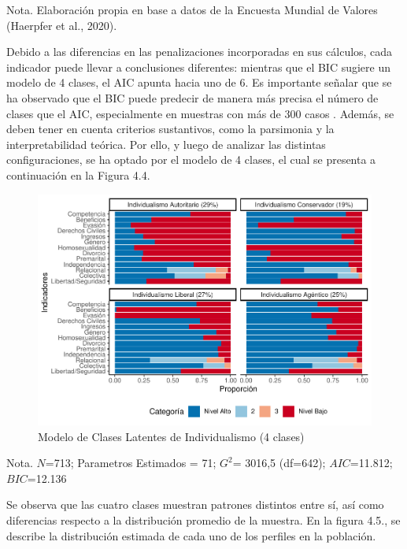 \documentclass[12pt,twoside]{templates/facsothesis}
\begin{document}
Nota. Elaboración propia en base a datos de la Encuesta Mundial de Valores (Haerpfer et al., 2020).

Debido a las diferencias en las penalizaciones incorporadas en sus cálculos, cada indicador puede llevar a conclusiones diferentes: mientras que el BIC sugiere un modelo de 4 clases, el AIC apunta hacia uno de 6. Es importante señalar que se ha observado que el BIC puede predecir de manera más precisa el número de clases que el AIC, especialmente en muestras con más de 300 casos \citep{nylund2007}. Además, se deben tener en cuenta criterios sustantivos, como la parsimonia y la interpretabilidad teórica. Por ello, y luego de analizar las distintas configuraciones, se ha optado por el modelo de 4 clases, el cual se presenta a continuación en la Figura 4.4.

\begin{figure}[!ht]

{\centering \includegraphics[width=1\linewidth,]{tesis_files/figure-latex/unnamed-chunk-10-1} 

}

\caption{Modelo de Clases Latentes de Individualismo (4 clases)}\label{fig:unnamed-chunk-10}
\end{figure}
\FloatBarrier

Nota. \(N\)=713; Parametros Estimados = 71; \(G^2\)= 3016,5 (df=642); \(AIC\)=11.812; \(BIC\)=12.136

Se observa que las cuatro clases muestran patrones distintos entre sí, así como diferencias respecto a la distribución promedio de la muestra. En la figura 4.5., se describe la distribución estimada de cada uno de los perfiles en la población.
\end{document}
